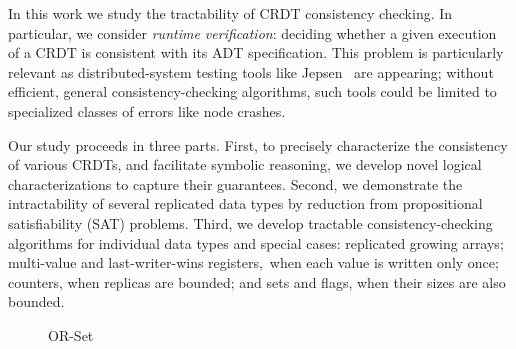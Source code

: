 In this work we study the tractability of CRDT consistency checking. In particular, we consider \emph{runtime verification}: deciding whether a given execution of a CRDT is consistent with its ADT specification. This problem is particularly relevant as distributed-system testing tools like Jepsen~\cite{MISC:Jepsen} are appearing; without efficient, general consistency-checking algorithms, such tools could be limited to specialized classes of errors like node crashes.

Our study proceeds in three parts.
First, to precisely characterize the consistency of various CRDTs, and facilitate symbolic reasoning, we develop novel logical characterizations to capture their guarantees.
Second, we demonstrate the intractability of several replicated data types by reduction from propositional satisfiability (SAT) problems.
Third, we develop tractable consistency-checking algorithms for individual data types and special cases: replicated growing arrays; multi-value and last-writer-wins registers, when each value is written only once; counters, when replicas are bounded; and sets and flags, when their sizes are also bounded.


\begin{figure}
\centering
{}  
\caption{OR-Set}
\label{fig:crdt:intro}
\end{figure}


